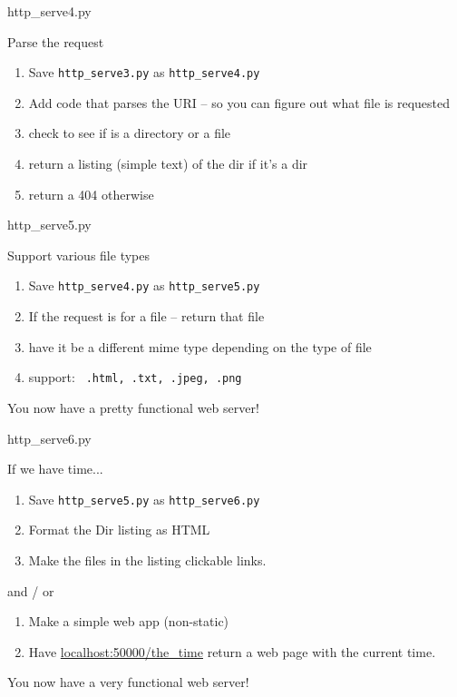 \documentclass{beamer}
\begin{document}
\begin{frame}[fragile]{http\_serve4.py}

{\Large Parse the request}
\begin{enumerate}
  \item Save \verb|http_serve3.py|  as \verb|http_serve4.py|
  \item Add code that parses the URI -- so you can figure out what file is requested
  \item check to see if is a directory or a file
  \item return a listing (simple text) of the dir if it's a dir
  \item return a 404 otherwise
\end{enumerate}

\end{frame}

\begin{frame}[fragile]{http\_serve5.py}

{\Large Support various file types}
\begin{enumerate}
  \item Save \verb|http_serve4.py|  as \verb|http_serve5.py|
  \item If the request is for a file -- return that file
  \item have it be a different mime type depending on the type of file
  \item support: \verb| .html, .txt, .jpeg, .png|
\end{enumerate}
\vfill
{\Large You now have a pretty functional web server!} 
\end{frame}

\begin{frame}[fragile]{http\_serve6.py}

{\Large If we have time...}
\begin{enumerate}
  \item Save \verb|http_serve5.py|  as \verb|http_serve6.py|
  \item Format the Dir listing as HTML
  \item Make the files in the listing clickable links.
\end{enumerate}
 and / or
\begin{enumerate}
  \item Make a simple web app (non-static)
  \item Have \url{localhost:50000/the_time} return a web page with the current time.
\end{enumerate}
\vfill
{\Large You now have a very functional web server!} 
\end{frame}
\end{document}
